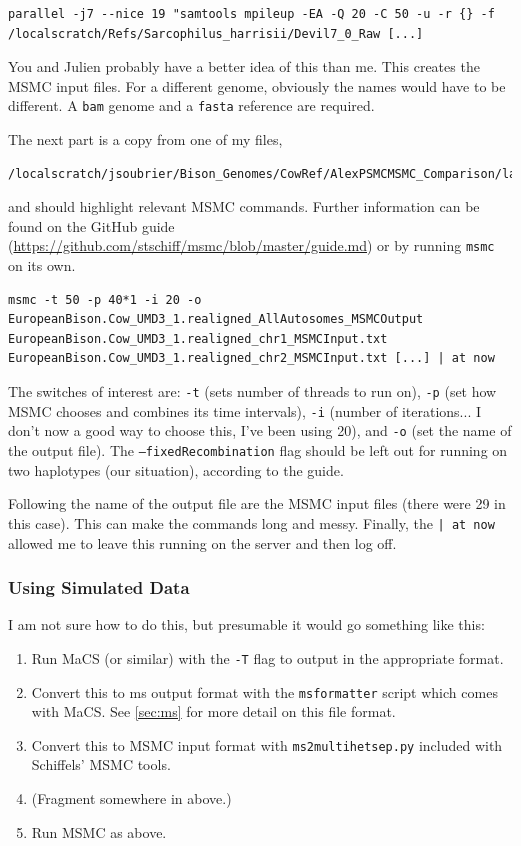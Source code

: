 \documentclass[11pt,a4paper]{article}
\begin{document}
\begin{lstlisting}
parallel -j7 --nice 19 "samtools mpileup -EA -Q 20 -C 50 -u -r {} -f /localscratch/Refs/Sarcophilus_harrisii/Devil7_0_Raw [...]
\end{lstlisting}
You and Julien probably have a better idea of this than me. This creates the MSMC input files. For a different genome, obviously the names would have to be different. A \texttt{bam} genome and a \texttt{fasta} reference are required.

The next part is a copy from one of my files, 
\begin{lstlisting}
/localscratch/jsoubrier/Bison_Genomes/CowRef/AlexPSMCMSMC_Comparison/labBook
\end{lstlisting}
and should highlight relevant MSMC commands. Further information can be found on the GitHub guide (\url{https://github.com/stschiff/msmc/blob/master/guide.md}) or by running \texttt{msmc} on its own.
\begin{lstlisting}
msmc -t 50 -p 40*1 -i 20 -o EuropeanBison.Cow_UMD3_1.realigned_AllAutosomes_MSMCOutput EuropeanBison.Cow_UMD3_1.realigned_chr1_MSMCInput.txt EuropeanBison.Cow_UMD3_1.realigned_chr2_MSMCInput.txt [...] | at now
\end{lstlisting}
The switches of interest are: \texttt{-t} (sets number of threads to run on), \texttt{-p} (set how MSMC chooses and combines its time intervals), \texttt{-i} (number of iterations... I don't now a good way to choose this, I've been using 20), and \texttt{-o} (set the name of the output file). The \texttt{--fixedRecombination} flag should be left out for running on two haplotypes (our situation), according to the guide.

Following the name of the output file are the MSMC input files (there were 29 in this case). This can make the commands long and messy. Finally, the \texttt{| at now} allowed me to leave this running on the server and then log off.

\subsubsection{Using Simulated Data}
I am not sure how to do this, but presumable it would go something like this:
\begin{enumerate}
\item Run MaCS (or similar) with the \texttt{-T} flag to output in the appropriate format.
\item Convert this to ms output format with the \texttt{msformatter} script which comes with MaCS. See \ref{sec:ms} for more detail on this file format.
\item Convert this to MSMC input format with \texttt{ms2multihetsep.py} included with Schiffels' MSMC tools. 
\item (Fragment somewhere in above.)
\item Run MSMC as above.
\end{enumerate}
\end{document}
